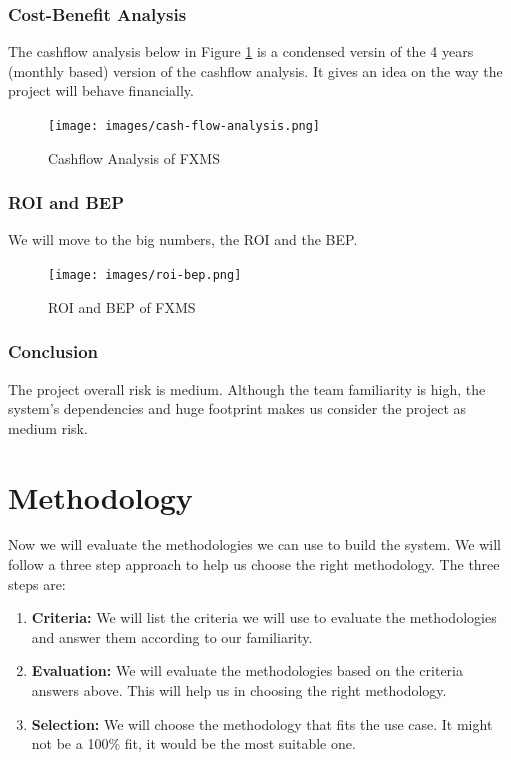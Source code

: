 \documentclass[a4paper]{report}
\begin{document}
\subsection{Cost-Benefit Analysis}

The cashflow analysis below in Figure \ref{fig:cash-flow-analysis} is a condensed versin of the 4 years (monthly based) version of the cashflow analysis. It gives an idea on the way the project will behave financially.

\begin{figure}[h!]
    \centering
    \texttt{[image: images/cash-flow-analysis.png]}
    \caption{Cashflow Analysis of FXMS}
    \label{fig:cash-flow-analysis}
\end{figure}

\subsection{ROI and BEP}

We will move to the big numbers, the ROI and the BEP.

\begin{figure}[h!]
    \centering
    \texttt{[image: images/roi-bep.png]}
    \caption{ROI and BEP of FXMS}
    \label{fig:roi-and-bep}
\end{figure}

\subsection{Conclusion}

The project overall risk is medium. Although the team familiarity is high, the system's dependencies and huge footprint makes us consider the project as medium risk.

\chapter{Methodology}

Now we will evaluate the methodologies we can use to build the system. We will follow a three step approach to help us choose the right methodology. The three steps are:

\begin{enumerate}
    \item \textbf{Criteria:} We will list the criteria we will use to evaluate the methodologies and answer them according to our familiarity.
    \item \textbf{Evaluation:} We will evaluate the methodologies based on the criteria answers above. This will help us in choosing the right methodology.
    \item \textbf{Selection:} We will choose the methodology that fits the use case. It might not be a 100\% fit, it would be the most suitable one.
\end{enumerate}
\end{document}
